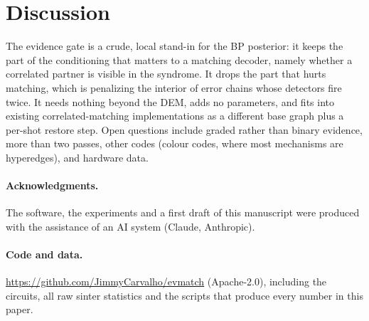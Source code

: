 \documentclass[aps,pra,twocolumn,superscriptaddress,nofootinbib]{revtex4-2}
\begin{document}
\section{Discussion}

The evidence gate is a crude, local stand-in for the BP posterior: it keeps
the part of the conditioning that matters to a matching decoder, namely
whether a correlated partner is visible in the syndrome. It drops the part
that hurts matching, which is penalizing the interior of error chains whose
detectors fire twice. It needs nothing beyond the DEM, adds no parameters, and
fits into existing correlated-matching implementations as a different base
graph plus a per-shot restore step. Open questions include graded rather than
binary evidence, more than two passes, other codes (colour codes, where most
mechanisms are hyperedges), and hardware data.

\paragraph{Acknowledgments.} The software, the experiments and a first
draft of this manuscript were produced with the assistance of an AI system
(Claude, Anthropic). %

\paragraph{Code and data.} \url{https://github.com/JimmyCarvalho/evmatch}
(Apache-2.0), including the circuits, all raw sinter statistics and the
scripts that produce every number in this paper.
\end{document}

